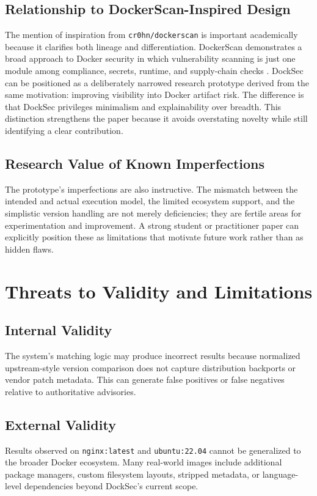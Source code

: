 \documentclass[12pt,draftclsnofoot,onecolumn]{IEEEtran}
\begin{document}
\subsection{Relationship to DockerScan-Inspired Design}
The mention of inspiration from \texttt{cr0hn/dockerscan} is important academically because it clarifies both lineage and differentiation. DockerScan demonstrates a broad approach to Docker security in which vulnerability scanning is just one module among compliance, secrets, runtime, and supply-chain checks \cite{dockerscanrepo}. DockSec can be positioned as a deliberately narrowed research prototype derived from the same motivation: improving visibility into Docker artifact risk. The difference is that DockSec privileges minimalism and explainability over breadth. This distinction strengthens the paper because it avoids overstating novelty while still identifying a clear contribution.

\subsection{Research Value of Known Imperfections}
The prototype's imperfections are also instructive. The mismatch between the intended and actual execution model, the limited ecosystem support, and the simplistic version handling are not merely deficiencies; they are fertile areas for experimentation and improvement. A strong student or practitioner paper can explicitly position these as limitations that motivate future work rather than as hidden flaws.

\section{Threats to Validity and Limitations}
\subsection{Internal Validity}
The system's matching logic may produce incorrect results because normalized upstream-style version comparison does not capture distribution backports or vendor patch metadata. This can generate false positives or false negatives relative to authoritative advisories.

\subsection{External Validity}
Results observed on \texttt{nginx:latest} and \texttt{ubuntu:22.04} cannot be generalized to the broader Docker ecosystem. Many real-world images include additional package managers, custom filesystem layouts, stripped metadata, or language-level dependencies beyond DockSec's current scope.
\end{document}
